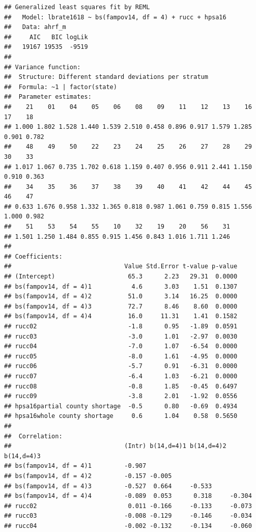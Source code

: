 \documentclass[
]{article}
\begin{document}
\begin{verbatim}
## Generalized least squares fit by REML
##   Model: lbrate1618 ~ bs(fampov14, df = 4) + rucc + hpsa16 
##   Data: ahrf_m 
##     AIC   BIC logLik
##   19167 19535  -9519
## 
## Variance function:
##  Structure: Different standard deviations per stratum
##  Formula: ~1 | factor(state) 
##  Parameter estimates:
##    21    01    04    05    06    08    09    11    12    13    16    17    18 
## 1.000 1.802 1.528 1.440 1.539 2.510 0.458 0.896 0.917 1.579 1.285 0.901 0.782 
##    48    49    50    22    23    24    25    26    27    28    29    30    33 
## 1.017 1.067 0.735 1.702 0.618 1.159 0.407 0.956 0.911 2.441 1.150 0.910 0.363 
##    34    35    36    37    38    39    40    41    42    44    45    46    47 
## 0.633 1.676 0.958 1.332 1.365 0.818 0.987 1.061 0.759 0.815 1.556 1.000 0.982 
##    51    53    54    55    10    32    19    20    56    31 
## 1.501 1.250 1.484 0.855 0.915 1.456 0.843 1.016 1.711 1.246 
## 
## Coefficients:
##                               Value Std.Error t-value p-value
## (Intercept)                    65.3      2.23   29.31  0.0000
## bs(fampov14, df = 4)1           4.6      3.03    1.51  0.1307
## bs(fampov14, df = 4)2          51.0      3.14   16.25  0.0000
## bs(fampov14, df = 4)3          72.7      8.46    8.60  0.0000
## bs(fampov14, df = 4)4          16.0     11.31    1.41  0.1582
## rucc02                         -1.8      0.95   -1.89  0.0591
## rucc03                         -3.0      1.01   -2.97  0.0030
## rucc04                         -7.0      1.07   -6.54  0.0000
## rucc05                         -8.0      1.61   -4.95  0.0000
## rucc06                         -5.7      0.91   -6.31  0.0000
## rucc07                         -6.4      1.03   -6.21  0.0000
## rucc08                         -0.8      1.85   -0.45  0.6497
## rucc09                         -3.8      2.01   -1.92  0.0556
## hpsa16partial county shortage  -0.5      0.80   -0.69  0.4934
## hpsa16whole county shortage     0.6      1.04    0.58  0.5650
## 
##  Correlation: 
##                               (Intr) b(14,d=4)1 b(14,d=4)2 b(14,d=4)3
## bs(fampov14, df = 4)1         -0.907                                 
## bs(fampov14, df = 4)2         -0.157 -0.005                          
## bs(fampov14, df = 4)3         -0.527  0.664     -0.533               
## bs(fampov14, df = 4)4         -0.089  0.053      0.318     -0.304    
## rucc02                         0.011 -0.166     -0.133     -0.073    
## rucc03                        -0.008 -0.129     -0.146     -0.034    
## rucc04                        -0.002 -0.132     -0.134     -0.060    

\end{verbatim}
\end{document}
